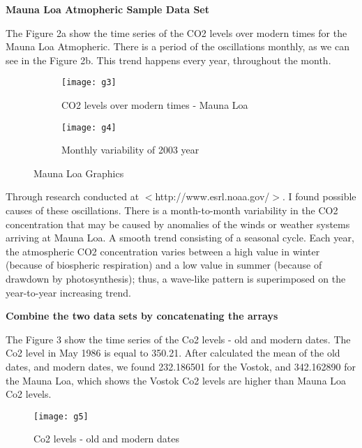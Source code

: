\documentclass[a4paper, 12pt]{article}
\begin{document}
\begin{flushleft}
\textbf{Mauna Loa Atmopheric Sample Data Set}

The Figure 2a show the time series of the CO2 levels over modern times for the Mauna Loa Atmopheric. There is a period of the oscillations monthly, as we can see in the Figure 2b. This trend happens every year, throughout the month.

\begin{figure}[h]
    \centering
    \begin{subfigure}[t]{.4\textwidth}
        \texttt{[image: g3]}
        \caption{CO2 levels over modern times - Mauna Loa}
        \label{fig:g3}
    \end{subfigure}
    \begin{subfigure}[t]{.4\textwidth}
        \texttt{[image: g4]}
        \caption{Monthly variability of 2003 year}
        \label{fig:diff_cosine}
    \end{subfigure}
    \caption{Mauna Loa Graphics}
    \label{fig:cosines}
\end{figure}



Through research conducted at $<$http://www.esrl.noaa.gov/$>$. I found possible causes of these oscillations. There is a month-to-month variability in the CO2 concentration that may be caused by anomalies of the winds or weather systems arriving at Mauna Loa. A smooth trend consisting of a seasonal cycle. Each year, the atmospheric CO2 concentration varies between a high value in winter (because of biospheric respiration) and a low value in summer (because of drawdown by photosynthesis); thus, a wave-like pattern is superimposed on the year-to-year increasing trend.

\textbf{Combine the two data sets by concatenating the arrays}

The Figure 3 show the time series of the Co2 levels - old and modern dates. The Co2 level in May 1986 is equal to 350.21. After calculated the mean of the old dates, and modern dates, we found 232.186501 for the Vostok, and 342.162890 for the Mauna Loa, which shows the Vostok Co2 levels are higher than Mauna Loa Co2 levels. 

\begin{figure}[h]
\centering
\texttt{[image: g5]}
\caption{Co2 levels - old and modern dates}
\end{figure}

\end{flushleft}
\end{document}
